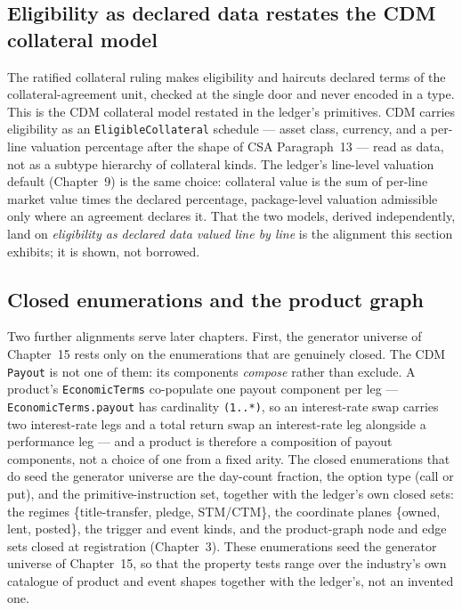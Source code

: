 \documentclass[11pt,a4paper]{article}
\begin{document}
\subsection{Eligibility as declared data restates the CDM collateral model}

The ratified collateral ruling makes eligibility and haircuts declared terms of
the collateral-agreement unit, checked at the single door and never encoded in a
type. This is the CDM collateral model restated in the ledger's primitives. CDM
carries eligibility as an \texttt{EligibleCollateral} schedule --- asset class,
currency, and a per-line valuation percentage after the shape of CSA
Paragraph~13 --- read as data, not as a subtype hierarchy of collateral kinds.
The ledger's line-level valuation default (Chapter~9) is the same choice:
collateral value is the sum of per-line market value times the declared
percentage, package-level valuation admissible only where an agreement declares
it. That the two models, derived independently, land on \emph{eligibility as
declared data valued line by line} is the alignment this section exhibits; it is
shown, not borrowed.

\subsection{Closed enumerations and the product graph}

Two further alignments serve later chapters. First, the generator universe of
Chapter~15 rests only on the enumerations that are genuinely closed. The CDM
\texttt{Payout} is not one of them: its components \emph{compose} rather than
exclude. A product's \texttt{EconomicTerms} co-populate one payout component per
leg --- \texttt{EconomicTerms.payout} has cardinality \texttt{(1..*)}, so an
interest-rate swap carries two interest-rate legs and a total return swap an
interest-rate leg alongside a performance leg --- and a product is therefore a
composition of payout components, not a choice of one from a fixed arity. The
closed enumerations that do seed the generator universe are the day-count
fraction, the option type (call or put), and the primitive-instruction set,
together with the ledger's own closed sets: the regimes \{title-transfer,
pledge, STM/CTM\}, the coordinate planes \{owned, lent, posted\}, the trigger and
event kinds, and the product-graph node and edge sets closed at registration
(Chapter~3). These enumerations seed the generator universe of Chapter~15, so
that the property tests range over the industry's own catalogue of product and
event shapes together with the ledger's, not an invented one.
\end{document}
